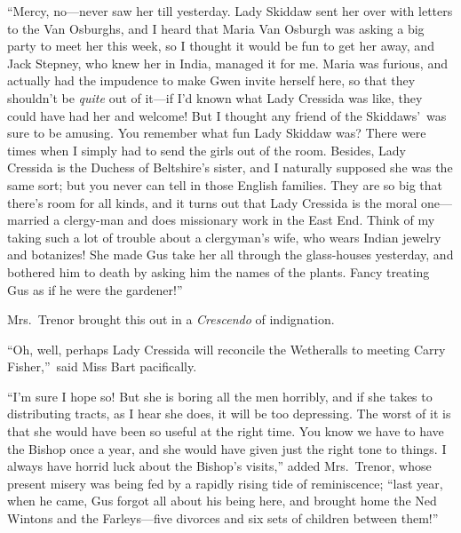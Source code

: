 \documentclass[12pt,a4paper]{book}
\begin{document}
``Mercy, no---never saw her till yesterday. Lady Skiddaw sent her
over with letters to the Van Osburghs, and I heard that Maria Van
Osburgh was asking a big party to meet her this week, so I
thought it would be fun to get her away, and Jack Stepney, who
knew her in India, managed it for me. Maria was furious, and
actually had the impudence to make Gwen invite herself here, so
that they shouldn't be \textit{quite} out of it---if I'd known what Lady
Cressida was like, they could have had her and welcome! But I
thought any friend of the Skiddaws'\ was sure to be amusing. You
remember what fun Lady Skiddaw was? There were times when I
simply had to send the girls out of the room. Besides, Lady
Cressida is the Duchess of Beltshire's sister, and I naturally
supposed she was the same sort; but you never can tell in those
English families. They are so big that there's room for
all kinds, and it turns out that Lady Cressida is the moral
one---married a clergy-man and does missionary work in the East
End. Think of my taking such a lot of trouble about a clergyman's
wife, who wears Indian jewelry and botanizes! She made Gus take
her all through the glass-houses yesterday, and bothered him to
death by asking him the names of the plants. Fancy treating Gus
as if he were the gardener!''





Mrs.\ Trenor brought this out in a \textit{Crescendo} of indignation.





``Oh, well, perhaps Lady Cressida will reconcile the Wetheralls to
meeting Carry Fisher,''\ said Miss Bart pacifically.





``I'm sure I hope so! But she is boring all the men horribly, and
if she takes to distributing tracts, as I hear she does, it will
be too depressing. The worst of it is that she would have been so
useful at the right time. You know we have to have the Bishop
once a year, and she would have given just the right tone to
things. I always have horrid luck about the Bishop's visits,''
added Mrs.\ Trenor, whose present misery was being fed by a
rapidly rising tide of reminiscence; ``last year, when he came,
Gus forgot all about his being here, and brought home the Ned
Wintons and the Farleys---five divorces and six sets of children
between them!''
\end{document}
